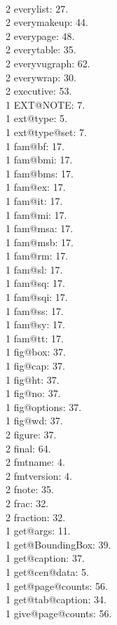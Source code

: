 \\2 everylist: 27.
\\2 everymakeup: 44.
\\2 everypage: 48.
\\2 everytable: 35.
\\2 everyvugraph: 62.
\\2 everywrap: 30.
\\2 executive: 53.
\\1 EXT@NOTE: 7.
\\1 ext@type: 5.
\\1 ext@type@set: 7.
\\1 fam@bf: 17.
\\1 fam@bmi: 17.
\\1 fam@bms: 17.
\\1 fam@ex: 17.
\\1 fam@it: 17.
\\1 fam@mi: 17.
\\1 fam@msa: 17.
\\1 fam@msb: 17.
\\1 fam@rm: 17.
\\1 fam@sl: 17.
\\1 fam@sq: 17.
\\1 fam@sqi: 17.
\\1 fam@ss: 17.
\\1 fam@sy: 17.
\\1 fam@tt: 17.
\\1 fig@box: 37.
\\1 fig@cap: 37.
\\1 fig@ht: 37.
\\1 fig@no: 37.
\\1 fig@options: 37.
\\1 fig@wd: 37.
\\2 figure: 37.
\\2 final: 64.
\\2 fmtname: 4.
\\2 fmtversion: 4.
\\2 fnote: 35.
\\2 frac: 32.
\\2 fraction: 32.
\\1 get@args: 11.
\\1 get@BoundingBox: 39.
\\1 get@caption: 37.
\\1 get@cen@data: 5.
\\1 get@page@counts: 56.
\\1 get@tab@caption: 34.
\\1 give@page@counts: 56.
